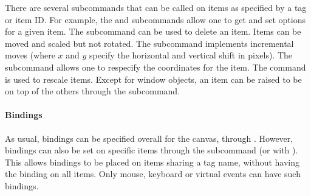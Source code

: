 There are several subcommands that can be called on items as specified
by a tag or item ID. For example, the 
and  subcommands allow one to get
and set options for a given item. The
 subcommand can be used to
delete an item. Items can be moved and scaled but not rotated. The
 subcommand implements
incremental moves (where $x$ and $y$ specify the horizontal and
vertical shift in pixels). The subcommand
 allows one
to respecify the coordinates for the item. The
 command is used to rescale items. Except for
window objects, an item can be raised to be on top of the others
through the  subcommand.



\paragraph{Bindings}
As usual, bindings can be specified overall for the canvas, through
. However, bindings can also be set on specific items
through the subcommand  (or with ). This allows
bindings to be placed on items sharing a tag name, without having the
binding on all items. Only mouse, keyboard or virtual events can have
such bindings.

